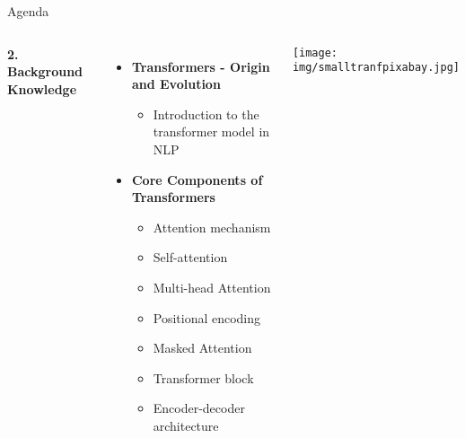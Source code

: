 \documentclass{beamer}
\begin{document}
\begin{frame}{Agenda}
\begin{columns}
\textbf{2. Background Knowledge}
\begin{itemize}
     
    \item \textbf{Transformers - Origin and Evolution}
    \begin{itemize}
        \item Introduction to the transformer model in NLP
    \end{itemize}
    \item \textbf{Core Components of Transformers}
    \begin{itemize}
    	\item Attention mechanism
        \item Self-attention 
        \item Multi-head Attention
        \item Positional encoding
        \item Masked Attention
        \item Transformer block
        \item Encoder-decoder architecture
    \end{itemize}
    \end{itemize}
\texttt{[image: img/smalltranfpixabay.jpg]} 
\end{columns}
   
\end{frame}


\end{document}
